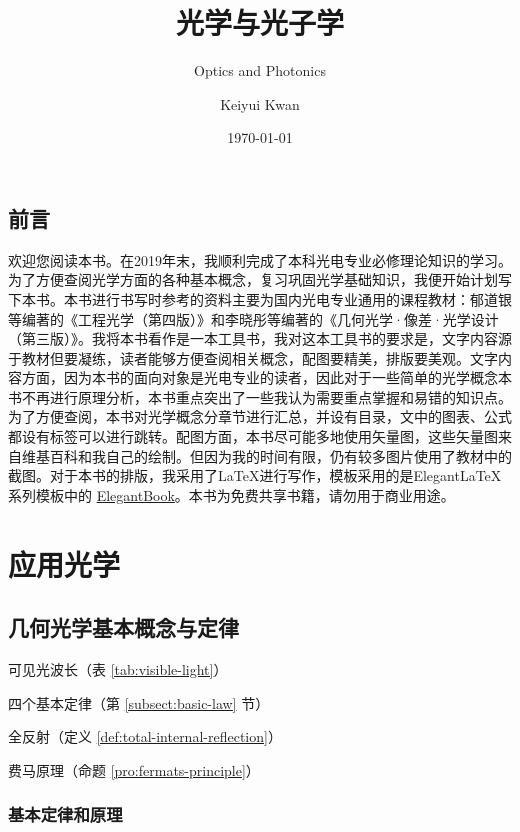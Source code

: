 \documentclass[cn,10pt,chinesefont=founder,math=newtx,cite=super,twoside]{elegantbook}
\title{光学与光子学}
\subtitle{\huge{Optics and Photonics}}
\author{Keiyui Kwan}
\institute{Zhejiang University}
\date{\today}
\begin{document}
	
\maketitle
\frontmatter

\chapter*{前言}
欢迎您阅读本书。在2019年末，我顺利完成了本科光电专业必修理论知识的学习。为了方便查阅光学方面的各种基本概念，复习巩固光学基础知识，我便开始计划写下本书。本书进行书写时参考的资料主要为国内光电专业通用的课程教材：郁道银等编著的《工程光学（第四版）》和李晓彤等编著的《几何光学·像差·光学设计（第三版）》。我将本书看作是一本工具书，我对这本工具书的要求是，文字内容源于教材但要凝练，读者能够方便查阅相关概念，配图要精美，排版要美观。文字内容方面，因为本书的面向对象是光电专业的读者，因此对于一些简单的光学概念本书不再进行原理分析，本书重点突出了一些我认为需要重点掌握和易错的知识点。为了方便查阅，本书对光学概念分章节进行汇总，并设有目录，文中的图表、公式都设有标签可以进行跳转。配图方面，本书尽可能多地使用矢量图，这些矢量图来自维基百科和我自己的绘制。但因为我的时间有限，仍有较多图片使用了教材中的截图。对于本书的排版，我采用了\LaTeX 进行写作，模板采用的是Elegant\LaTeX 系列模板中的 \href{https://github.com/ElegantLaTeX/ElegantBook}{ElegantBook}。本书为免费共享书籍，请勿用于商业用途。

\tableofcontents

\mainmatter

\part{应用光学}

\chapter{几何光学基本概念与定律}

\begin{introduction}
	\item 可见光波长（表 \ref{tab:visible-light}）
	\item 四个基本定律（第 \ref{subsect:basic-law} 节）
	\item 全反射（定义 \ref{def:total-internal-reflection}）
	\item 费马原理（命题 \ref{pro:fermats-principle}）
\end{introduction}

\section{基本定律和原理}
\end{document}
